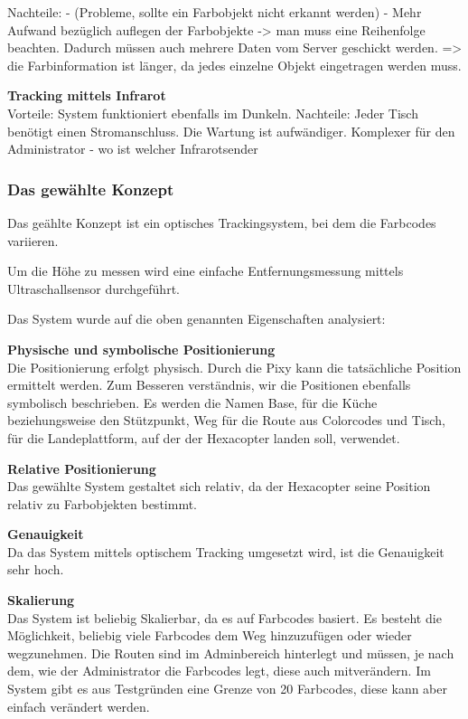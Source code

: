 \begin{itemize}
      Nachteile:
      - (Probleme, sollte ein Farbobjekt nicht erkannt werden)
      - Mehr Aufwand bezüglich auflegen der Farbobjekte -> man muss eine Reihenfolge beachten. Dadurch müssen auch mehrere Daten vom Server geschickt werden. => die Farbinformation ist länger, da jedes einzelne Objekt eingetragen werden muss. 



      \textbf{Tracking mittels Infrarot}\\


      Vorteile:
      System funktioniert ebenfalls im Dunkeln.
      Nachteile: 
      Jeder Tisch benötigt einen Stromanschluss.
      Die Wartung ist aufwändiger.
      Komplexer für den Administrator - wo ist welcher Infrarotsender


      \subsubsection{Das gewählte Konzept}

      Das geählte Konzept ist ein optisches Trackingsystem, bei dem die Farbcodes variieren.

      Um die Höhe zu messen wird eine einfache Entfernungsmessung mittels Ultraschallsensor durchgeführt.

      Das System wurde auf die oben genannten Eigenschaften analysiert:

      \textbf{Physische und symbolische Positionierung}\\
      Die Positionierung erfolgt physisch. Durch die Pixy kann die tatsächliche Position ermittelt werden.
      Zum Besseren verständnis, wir die Positionen ebenfalls symbolisch beschrieben. Es werden die Namen Base, für die Küche beziehungsweise den Stützpunkt, Weg für die Route aus Colorcodes und Tisch, für die Landeplattform, auf der der Hexacopter landen soll, verwendet.

      \textbf{Relative Positionierung}\\
      Das gewählte System gestaltet sich relativ, da der Hexacopter seine Position relativ zu Farbobjekten bestimmt.

      \textbf{Genauigkeit}\\
      Da das System mittels optischem Tracking umgesetzt wird, ist die Genauigkeit sehr hoch.
      
      \textbf{Skalierung}\\

      Das System ist beliebig Skalierbar, da es auf Farbcodes basiert. Es besteht die Möglichkeit, beliebig viele Farbcodes dem Weg hinzuzufügen oder wieder wegzunehmen. Die Routen sind im Adminbereich hinterlegt und müssen, je nach dem, wie der Administrator die Farbcodes legt, diese auch mitverändern. Im System gibt es aus Testgründen eine Grenze von 20 Farbcodes, diese kann aber einfach verändert werden.


\end{itemize}
